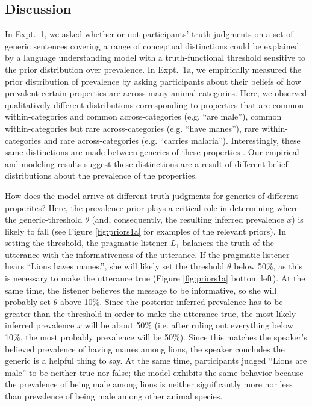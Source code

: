 \documentclass[10pt,letterpaper]{article}
\begin{document}
\subsection{Discussion}

In Expt.~1, we asked whether or not participants' truth judgments on a set of generic sentences covering a range of conceptual distinctions could be explained by a language understanding model with a truth-functional threshold sensitive to the prior distribution over prevalence. 
In Expt.~1a, we empirically measured the prior distribution of prevalence by asking participants about their beliefs of how prevalent certain properties are across many animal categories. 
Here, we observed qualitatively different distributions corresponding to properties that are common within-categories and common across-categories (e.g. ``are male''), common within-categories but rare across-categories (e.g. ``have manes''), rare within-categories and rare across-categories (e.g. ``carries malaria''). Interestingly, these same distinctions are made between generics of these properties \cite{Prasada2013}. 
Our empirical and modeling results suggest these distinctions are a result of different belief distributions about the prevalence of the properties.

How does the model arrive at different truth judgments for generics of different properites?
Here, the prevalence prior plays a critical role in determining where the generic-threshold $\theta$ (and, consequently, the resulting inferred prevalence $x$) is likely to fall (see Figure \ref{fig:priors1a} for examples of the relevant priors). 
In setting the threshold, the pragmatic listener $L_{1}$ balances the truth of the utterance with the informativeness of the utterance. 
If the pragmatic listener hears ``Lions haves manes.'', she will likely set the threshold $\theta$ below 50\%, as this is necessary to make the utterance true (Figure \ref{fig:priors1a} bottom left). 
At the same time, the listener believes the message to be informative, so she will probably set $\theta$ above 10\%. 
Since the posterior inferred prevalence has to be greater than the threshold in order to make the utterance true, the most likely inferred prevalence $x$ will be about 50\% (i.e. after ruling out everything below 10\%, the most probably prevalence will be 50\%). 
Since this matches the speaker's believed prevalence of having manes among lions, the speaker concludes the generic is a helpful thing to say.
At the same time, participants judged ``Lions are male'' to be neither true nor false; the model exhibits the same behavior because the prevalence of being male among lions is neither significantly more nor less than prevalence of being male among other animal species. 
\end{document}
